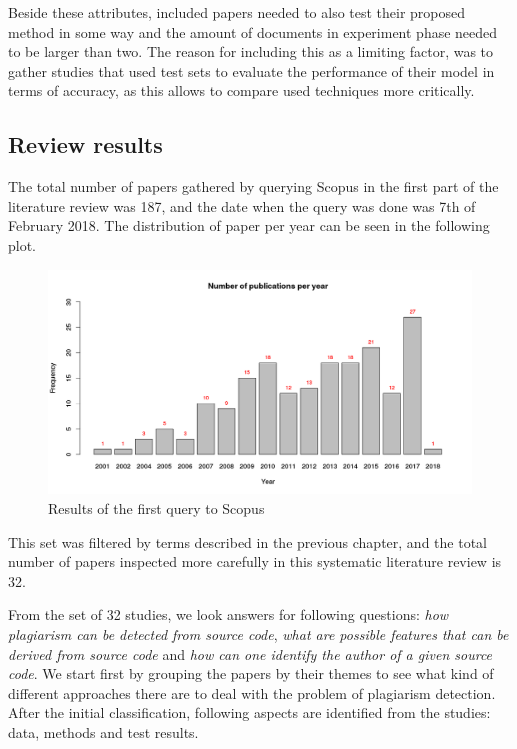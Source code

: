 Beside these attributes, included papers needed to also test their proposed method in some way and the amount of documents in experiment phase needed to be larger than two. The reason for including this as a limiting factor, was to gather studies that used test sets to evaluate the performance of their model in terms of accuracy, as this allows to compare used techniques more critically. 


\subsection{Review results}

The total number of papers gathered by querying Scopus in the first part of the literature review was 187, and the date when the query was done was 7th of February 2018. The distribution of paper per year can be seen in the following plot.

\begin{figure}[h]
\centering
\includegraphics[width=\textwidth]{plots/Rplot.png}
\caption{Results of the first query to Scopus}
\end{figure}

\noindent
This set was filtered by terms described in the previous chapter, and the total number of papers inspected more carefully in this systematic literature review is 32. 

From the set of 32 studies, we look answers for following questions: \emph{how plagiarism can be detected from source code}, \emph{what are possible features that can be derived from source code} and \emph{how can one identify the author of a given source code}. We start first by grouping the papers by their themes to see what kind of different approaches there are to deal with the problem of plagiarism detection. After the initial classification, following aspects are identified from the studies: data, methods and test results. 


